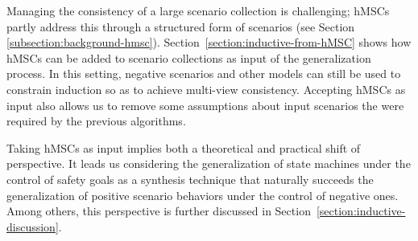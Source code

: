 Managing the consistency of a large scenario collection is challenging; hMSCs partly address this through a structured form of scenarios (see Section \ref{subsection:background-hmsc}). Section~\ref{section:inductive-from-hMSC} shows how hMSCs can be added to scenario collections as input of the generalization process. In this setting, negative scenarios and other models can still be used to constrain induction so as to achieve multi-view consistency. Accepting hMSCs as input also allows us to remove some assumptions about input scenarios the were required by the previous algorithms.

Taking hMSCs as input implies both a theoretical and practical shift of perspective. It leads us considering the generalization of state machines under the control of safety goals as a synthesis technique that naturally succeeds the generalization of positive scenario behaviors under the control of negative ones. Among others, this perspective is further discussed in Section~\ref{section:inductive-discussion}.
